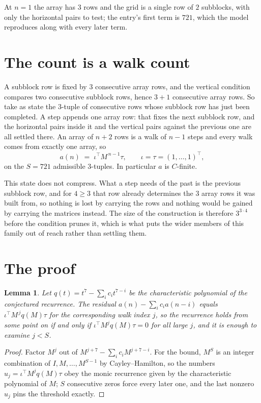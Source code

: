 \documentclass[11pt,a4paper]{article}
\theoremstyle{plain}
\newtheorem{lemma}[theorem]{Lemma}
\theoremstyle{definition}
\begin{document}
At $n=1$ the array has $3$ rows and the grid is a single row of $2$
subblocks, with only the horizontal pairs to test; the entry's first term is
$721$, which the model reproduces along with every later term.

\section{The count is a walk count}

A subblock row is fixed by $3$ consecutive array rows, and the vertical condition compares
two consecutive subblock rows, hence $3+1$ consecutive array rows. So take as state the
$3$-tuple of consecutive rows whose subblock row has just been completed. A step appends one
array row: that fixes the next subblock row, and the horizontal pairs inside it and the
vertical pairs against the previous one are all settled there. An array of $n+2$ rows is
a walk of $n-1$ steps and every walk comes from exactly one array, so
\[
a(n)\;=\;\iota^{\!\top}M^{\,n-1}\tau,\qquad\iota=\tau=(1,\dots,1)^{\!\top},
\]
on the $S=721$ admissible $3$-tuples. In particular $a$ is $C$-finite.

This state does not compress. What a step needs of the past is the previous subblock row, and
for $4\ge3$ that row already determines the $3$ array rows it was built from, so nothing
is lost by carrying the rows and nothing would be gained by carrying the matrices instead. The
size of the construction is therefore $3^{3\cdot4}$ before the condition prunes
it, which is what puts the wider members of this family out of reach rather than settling them.

\section{The proof}

\begin{lemma}\label{lem:crit}
Let $q(t)=t^{7}-\sum_i c_it^{7-i}$ be the characteristic polynomial of the
conjectured recurrence. The residual $a(n)-\sum_ic_ia(n-i)$ equals
$\iota^{\!\top}M^{\,j}q(M)\tau$ for the corresponding walk index $j$, so the recurrence
holds from some point on if and only if $\iota^{\!\top}M^{j}q(M)\tau=0$ for all large $j$,
and it is enough to examine $j<S$.
\end{lemma}

\begin{proof}
Factor $M^{j}$ out of $M^{j+7}-\sum_ic_iM^{j+7-i}$. For the bound, $M^{S}$
is an integer combination of $I,M,\dots,M^{S-1}$ by Cayley--Hamilton, so the numbers
$u_j=\iota^{\!\top}M^{j}q(M)\tau$ obey the monic recurrence given by the characteristic
polynomial of $M$; $S$ consecutive zeros force every later one, and the last nonzero $u_j$
pins the threshold exactly.
\end{proof}
\end{document}

